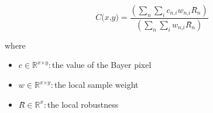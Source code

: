 \documentclass[12pt]{article}
\begin{document}
\[
\textit{C(x,y)} = \frac{(\sum_\textit{n} \sum_\textit{i} \textit{c}_{\textit{n}, \textit{i}}\textit{w}_{\textit{n}, \textit{i}}\textit{R̂}_{ \textit{n} })}{(\sum_\textit{n} \sum_\textit{i} \textit{w}_{\textit{n}, \textit{i}}\textit{R̂}_{ \textit{n} })}
\]

where
\begin{itemize}
\item $\textit{c} \in \mathbb{R}^{ \textit{x} \times \textit{y} }:$the value of the Bayer pixel
\item $\textit{w} \in \mathbb{R}^{ \textit{x} \times \textit{y} }:$the local sample weight
\item $\textit{R̂} \in \mathbb{R}^{ \textit{x}}:$the local robustness
\end{itemize}
\end{document}
